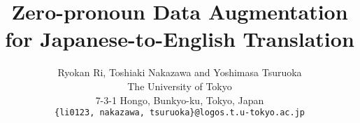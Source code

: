 \documentclass[11pt,a4paper]{article}
\title{Zero-pronoun Data Augmentation for Japanese-to-English Translation}
\author{Ryokan Ri, Toshiaki Nakazawa and Yoshimasa Tsuruoka\\
  The University of Tokyo \\
  7-3-1 Hongo, Bunkyo-ku, Tokyo, Japan \\
  \texttt{\{li0123, nakazawa, tsuruoka\}@logos.t.u-tokyo.ac.jp} \\}
\date{}
\begin{document}
\maketitle
\begin{abstract}

\end{abstract}










\newpage
\onecolumn
\appendix

\end{document}
